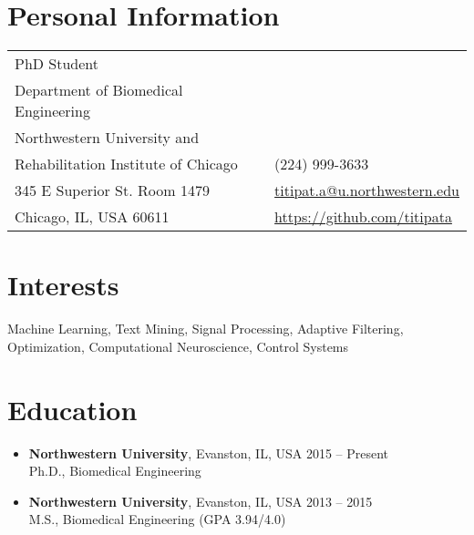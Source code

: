 \documentclass[margin,line]{res}
\def\envelope{{\FA \faEnvelopeO}}
\def\phone{{\FA \faMobilePhone}}
\def\github{{\FA \faGithubAlt}}
\begin{document}

\begin{resume}

\section{\sc Personal Information}
\vspace{.05in}
\begin{tabular}{@{}p{3.5in}p{3in}}
PhD Student                          \\
Department of Biomedical Engineering \\
Northwestern University and			   & \\
Rehabilitation Institute of Chicago		& {\bf \phone} (224) 999-3633 \\
345 E Superior St. Room 1479 		& {\bf \envelope } \href{mailto:titipat.a@u.northwestern.edu}{titipat.a@u.northwestern.edu}\\
Chicago, IL, USA 60611				&{\bf \github } \href{https://github.com/titipata}{https://github.com/titipata}
\end{tabular}


\section{\sc Interests}

Machine Learning, Text Mining, Signal Processing, Adaptive Filtering, Optimization, Computational Neuroscience, Control Systems



\section{\sc Education}

\begin{itemize}[leftmargin=0cm, label={}]

\item {\bf Northwestern University}, Evanston, IL, USA 			\hfill 2015 -- Present \\
Ph.D., Biomedical Engineering

\item {\bf Northwestern University}, Evanston, IL, USA 			\hfill 2013 -- 2015 \\
M.S., Biomedical Engineering 					\hfill (GPA 3.94/4.0)


\end{itemize}
\end{resume}
\end{document}
